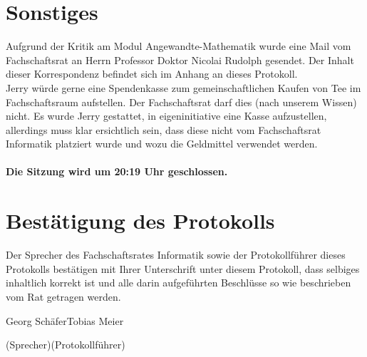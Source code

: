 \documentclass[a4paper, 11pt]{article} %
\newcommand{\TeXer}{Tobias Meier}
\newcommand{\fsiPresident}{Georg Schäfer}
\begin{document}
\section{Sonstiges}
Aufgrund der Kritik am Modul Angewandte-Mathematik wurde eine Mail vom Fachschaftsrat an Herrn Professor Doktor Nicolai Rudolph gesendet. Der Inhalt dieser Korrespondenz befindet sich im Anhang an dieses Protokoll.\\
Jerry würde gerne eine Spendenkasse zum gemeinschaftlichen Kaufen von Tee im Fachschaftsraum aufstellen. Der Fachschaftsrat darf dies (nach unserem Wissen) nicht. Es wurde Jerry gestattet, in eigeninitiative eine Kasse aufzustellen, allerdings muss klar ersichtlich sein, dass diese nicht vom Fachschaftsrat Informatik platziert wurde und wozu die Geldmittel verwendet werden.\\\\
\textbf{Die Sitzung wird um 20:19 Uhr geschlossen.}
\pagebreak

\section{Bestätigung des Protokolls}
Der Sprecher des Fachschaftsrates Informatik sowie der Protokollführer dieses Protokolls bestätigen mit Ihrer Unterschrift unter diesem Protokoll, dass selbiges inhaltlich korrekt ist und alle darin aufgeführten Beschlüsse so wie beschrieben vom Rat getragen werden.
\\

\vspace{3.5cm}
\hrulefill \hfill \hrulefill

\fsiPresident \hfill \TeXer

{\footnotesize (Sprecher)\hfill (Protokollführer)}

\pagebreak
\end{document}
